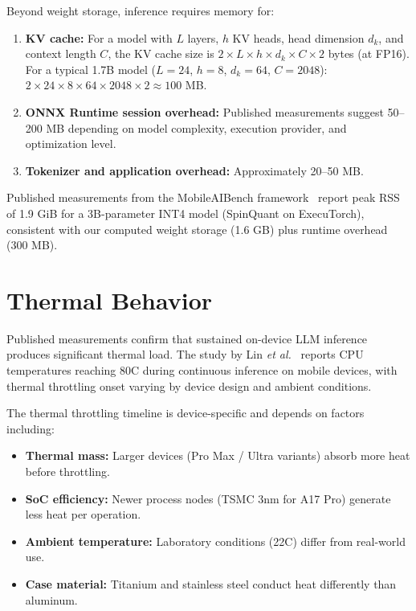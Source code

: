 \documentclass[12pt, letterpaper, twoside]{report}
\newcommand{\etal}{\textit{et al.}\xspace}
\begin{document}
Beyond weight storage, inference requires memory for:

\begin{enumerate}[itemsep=3pt]
\item \textbf{KV cache:} For a model with $L$ layers, $h$ KV heads, head dimension $d_k$, and context length $C$, the KV cache size is $2 \times L \times h \times d_k \times C \times 2$ bytes (at FP16). For a typical 1.7B model ($L = 24$, $h = 8$, $d_k = 64$, $C = 2048$): $2 \times 24 \times 8 \times 64 \times 2048 \times 2 \approx 100$ MB.

\item \textbf{ONNX Runtime session overhead:} Published measurements suggest 50--200 MB depending on model complexity, execution provider, and optimization level.

\item \textbf{Tokenizer and application overhead:} Approximately 20--50 MB.
\end{enumerate}

Published measurements from the MobileAIBench framework~\citep{wang2024survey_llm_edge} report peak RSS of 1.9 GiB for a 3B-parameter INT4 model (SpinQuant on ExecuTorch), consistent with our computed weight storage (1.6 GB) plus runtime overhead (300 MB).

\section{Thermal Behavior}
\label{sec:thermal}

Published measurements confirm that sustained on-device LLM inference produces significant thermal load. The study by Lin \etal~\citep{lin2024ondevice_survey} reports CPU temperatures reaching 80\textdegree C during continuous inference on mobile devices, with thermal throttling onset varying by device design and ambient conditions.

The thermal throttling timeline is device-specific and depends on factors including:

\begin{itemize}[itemsep=1pt, topsep=2pt, parsep=0pt]
\item \textbf{Thermal mass:} Larger devices (Pro Max / Ultra variants) absorb more heat before throttling.
\item \textbf{SoC efficiency:} Newer process nodes (TSMC 3nm for A17 Pro) generate less heat per operation.
\item \textbf{Ambient temperature:} Laboratory conditions (22\textdegree C) differ from real-world use.
\item \textbf{Case material:} Titanium and stainless steel conduct heat differently than aluminum.
\end{itemize}
\end{document}
